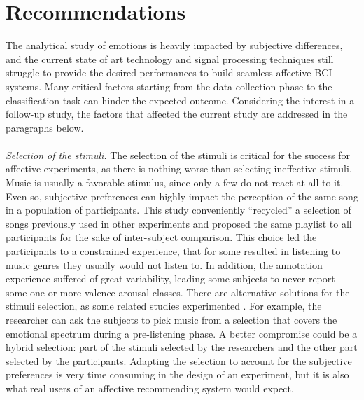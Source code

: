 \section{Recommendations}
\label{sec:recommendations}
The analytical study of emotions is heavily impacted by subjective differences, and the current state of art technology and signal processing techniques still struggle to provide the desired performances to build seamless affective \ac{BCI} systems. Many critical factors starting from the data collection phase to the classification task can hinder the expected outcome. Considering the interest in a follow-up study, the factors that affected the current study are addressed in the paragraphs below. 
\\
\\
\emph{Selection of the stimuli.} The selection of the stimuli is critical for the success for affective experiments, as there is nothing worse than selecting ineffective stimuli. Music is usually a favorable stimulus, since only a few do not react at all to it. Even so, subjective preferences can highly impact the perception of the same song in a population of participants. This study conveniently “recycled” a selection of songs previously used in other experiments and proposed the same playlist to all participants for the sake of inter-subject comparison. This choice led the participants to a constrained experience, that for some resulted in listening to music genres they usually would not listen to. In addition, the annotation experience suffered of great variability, leading some subjects to never report some one or more valence-arousal classes. There are alternative solutions for the stimuli selection, as some related studies experimented \cite{thammasan_continuous_2016}. For example, the researcher can ask the subjects to pick music from a selection that covers the emotional spectrum during a pre-listening phase. A better compromise could be a hybrid selection: part of the stimuli selected by the researchers and the other part selected by the participants. Adapting the selection to account for the subjective preferences is very time consuming in the design of an experiment, but it is also what real users of an affective recommending system would expect.
\\
\\
